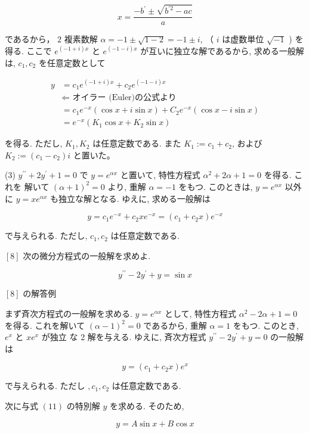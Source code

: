 \documentclass[10pt]{article}
\begin{document}
$$
x=\frac{-b^{\prime} \pm \sqrt{b^{\prime 2}-a c}}{a}
$$

であるから， $2$ 複素数解 $\alpha=-1 \pm \sqrt{1-2}=-1 \pm i$, （ $i$ は虚数単位 $\sqrt{-1}$ ) を得る. ここで $e^{(-1+i) x}$ と $e^{(-1-i) x}$ が互いに独立な解であるから, 求める一般解は, $c_{1}, c_{2}$ を任意定数として

$$
\begin{aligned}
y & =c_{1} e^{(-1+i) x}+c_{2} e^{(-1-i) x} \\
& \Longleftarrow \text { オイラー (Euler)の公式より } \\
& =c_{1} e^{-x}(\cos x+i \sin x)+C_{2} e^{-x}(\cos x-i \sin x) \\
& =e^{-x}\left(K_{1} \cos x+K_{2} \sin x\right)
\end{aligned}
$$

を得る. ただし, $K_{1}, K_{2}$ は任意定数である. また $K_{1}:=c_{1}+c_{2}$, および $K_{2}:=\left(c_{1}-c_{2}\right) i$ と置いた。

(3) $y^{\prime \prime}+2 y^{\prime}+1=0$ で $y=e^{\alpha x}$ と置いて, 特性方程式 $\alpha^{2}+2 \alpha+1=0$ を得る. これを 解いて $(\alpha+1)^{2}=0$ より, 重解 $\alpha=-1$ をもつ. このときは, $y=e^{\alpha x}$ 以外に $y=x e^{\alpha x}$ も独立な解となる. ゆえに, 求める一般解は

$$
y=c_{1} e^{-x}+c_{2} x e^{-x}=\left(c_{1}+c_{2} x\right) e^{-x}
$$

で与えられる. ただし, $c_{1}, c_{2}$ は任意定数である.

$[8]$ 次の微分方程式の一般解を求めよ.


\begin{equation*}
y^{\prime \prime}-2 y^{\prime}+y=\sin x \tag{11}
\end{equation*}


$[8]$ の解答例

まず斉次方程式の一般解を求める. $y=e^{\alpha x}$ として, 特性方程式 $\alpha^{2}-2 \alpha+1=0$ を得る. これを解いて $(\alpha-1)^{2}=0$ であるから, 重解 $\alpha=1$ をもつ. このとき, $e^{x}$ と $x e^{x}$ が独立 な 2 解を与える. ゆえに, 斉次方程式 $y^{\prime \prime}-2 y^{\prime}+y=0$ の一般解は

$$
y=\left(c_{1}+c_{2} x\right) e^{x}
$$

で与えられる. ただし $, c_{1}, c_{2}$ は任意定数である.

次に与式 $(11)$ の特別解 $y$ を求める. そのため,


\begin{equation*}
y=A \sin x+B \cos x \tag{*1}
\end{equation*}
\end{document}
